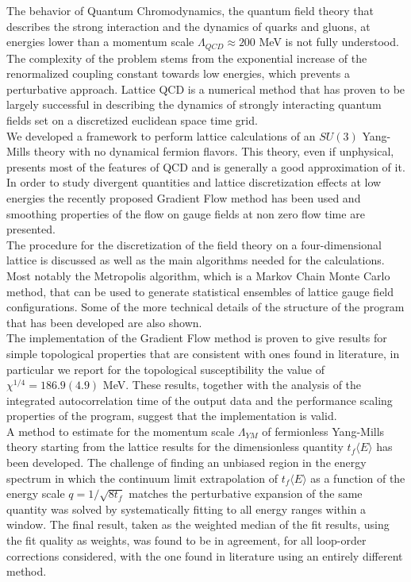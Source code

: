 The behavior of Quantum Chromodynamics, the quantum field theory that describes the strong interaction and the dynamics of quarks and gluons, at energies lower than a momentum scale $\Lambda_{QCD} \approx 200$ MeV is not fully understood. The complexity of the problem stems from the exponential increase of the renormalized coupling constant towards low energies, which prevents a perturbative approach. Lattice QCD is a numerical method that has proven to be largely successful in describing the dynamics of strongly interacting quantum fields set on a discretized euclidean space time grid.\\

We developed a framework to perform lattice calculations of an $SU(3)$ Yang-Mills theory with no dynamical fermion flavors. This theory, even if unphysical, presents most of the features of QCD and is generally a good approximation of it. In order to study divergent quantities and lattice discretization effects at low energies the recently proposed Gradient Flow method \cite{luscher_properties_2010} has been used and smoothing properties of the flow on gauge fields at non zero flow time are presented. \\
The procedure for the discretization of the field theory on a four-dimensional lattice is discussed as well as the main algorithms needed for the calculations. Most notably the Metropolis algorithm, which is a Markov Chain Monte Carlo method, that can be used to generate statistical ensembles of lattice gauge field configurations. Some of the more technical details of the structure of the program that has been developed are also shown.\\

The implementation of the Gradient Flow method is proven to give results for simple topological properties that are consistent with ones found in literature, in particular we report for the topological susceptibility the value of $\chi^{1/4} = 186.9(4.9)$ MeV. These results, together with the analysis of the integrated autocorrelation time of the output data and the performance scaling properties of the program, suggest that the implementation is valid.\\
A method to estimate for the momentum scale $\Lambda_{YM}$ of fermionless Yang-Mills theory starting from the lattice results for the dimensionless quantity $t_f\langle E \rangle$ has been developed. The challenge of finding an unbiased region in the energy spectrum in which the continuum limit extrapolation of $t_f\langle E \rangle$ as a function of the energy scale $q=1/\sqrt{8t_f}$ matches the perturbative expansion of the same quantity was solved by systematically fitting to all energy ranges within a window. The final result, taken as the weighted median of the fit results, using the fit quality as weights, was found to be in agreement, for all loop-order corrections considered, with the one found in literature \cite{capitani_non-perturbative_1999} using an entirely different method.
